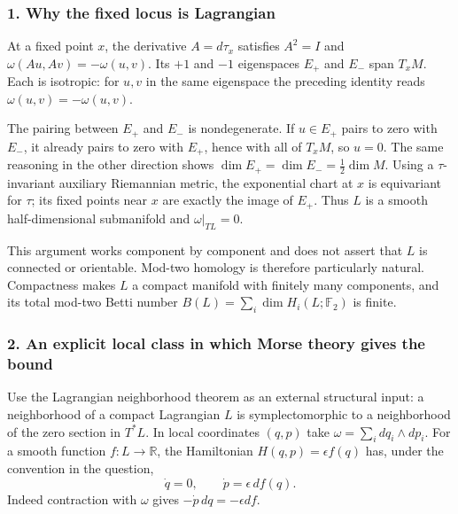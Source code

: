 \documentclass[11pt]{article}
\begin{document}
\subsubsection{1. Why the fixed locus is Lagrangian}
At a fixed point $x$, the derivative $A=d\tau_x$ satisfies $A^2=I$ and
$\omega(Au,Av)=-\omega(u,v)$. Its $+1$ and $-1$ eigenspaces $E_+$ and $E_-$ span $T_xM$. Each is isotropic: for $u,v$ in the same eigenspace the preceding identity reads $\omega(u,v)=-\omega(u,v)$.

The pairing between $E_+$ and $E_-$ is nondegenerate. If $u\in E_+$ pairs to zero with $E_-$, it already pairs to zero with $E_+$, hence with all of $T_xM$, so $u=0$. The same reasoning in the other direction shows $\dim E_+=\dim E_-=\tfrac12\dim M$. Using a $\tau$-invariant auxiliary Riemannian metric, the exponential chart at $x$ is equivariant for $\tau$; its fixed points near $x$ are exactly the image of $E_+$. Thus $L$ is a smooth half-dimensional submanifold and $\omega|_{TL}=0$.

This argument works component by component and does not assert that $L$ is connected or orientable. Mod-two homology is therefore particularly natural. Compactness makes $L$ a compact manifold with finitely many components, and its total mod-two Betti number
$B(L)=\sum_i\dim H_i(L;\mathbb F_2)$ is finite.

\subsubsection{2. An explicit local class in which Morse theory gives the bound}
Use the Lagrangian neighborhood theorem as an external structural input: a neighborhood of a compact Lagrangian $L$ is symplectomorphic to a neighborhood of the zero section in $T^*L$. In local coordinates $(q,p)$ take
$\omega=\sum_i dq_i\wedge dp_i$. For a smooth function $f:L\to\mathbb R$, the Hamiltonian $H(q,p)=\epsilon f(q)$ has, under the convention in the question,
\[
 \dot q=0,\qquad \dot p=\epsilon\,df(q).               \tag{1}
\]
Indeed contraction with $\omega$ gives $-\dot p\,dq=-\epsilon df$.
\end{document}
